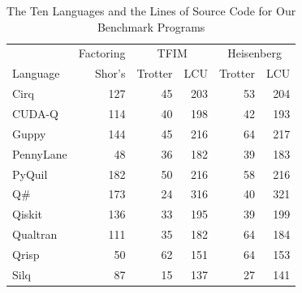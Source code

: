 \begin{table}[t]
  \centering
  \caption{The Ten Languages and the Lines of Source Code for Our Benchmark Programs}
  \label{tab:program-size}
  \begin{tabular}{l|r|rr|rr}
    \toprule
             & Factoring & \multicolumn{2}{c|}{TFIM} & \multicolumn{2}{c}{Heisenberg} \\
    Language & Shor's & Trotter & LCU & Trotter & LCU \\
    \midrule
    Cirq             & 127 & 45 & 203 & 53 & 204 \\
    CUDA-Q           & 114 & 40 & 198 & 42 & 193 \\
    Guppy            & 144 & 45 & 216 & 64 & 217 \\
    PennyLane        & 48 & 36 & 182 & 39 & 183 \\
    PyQuil           & 182 & 50 & 216 & 58 & 216 \\
    Q\#              & 173 & 24 & 316 & 40 & 321 \\
    Qiskit           & 136 & 33 & 195 & 39 & 199 \\
    Qualtran         & 111 & 35 & 182 & 64 & 184 \\
    Qrisp            & 50 & 62 & 151 & 64 & 153 \\
    Silq             & 87 & 15 & 137 & 27 & 141 \\
    \bottomrule
  \end{tabular}
\end{table}
%
